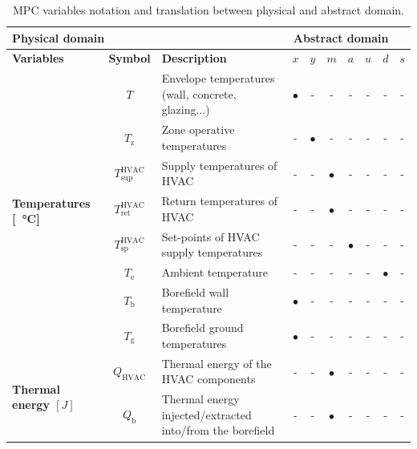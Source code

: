 \documentclass[10pt]{article}
\begin{document}
\begin{table}[ht]
	{\color{blue} 
	\centering
	\caption{MPC variables notation and translation between physical and abstract domain.}
	\label{tab:mpc_form:translation}
	\begin{adjustwidth}{-1cm}{}
	\begin{tabular}{l|c|l|ccccccc}
		\toprule
        \multicolumn{3}{l}{\textbf{Physical domain}} &  \multicolumn{6}{r}{\textbf{Abstract domain}} \\
		\toprule
		\textbf{Variables} & \textbf{Symbol} & \textbf{Description} & \textbf{$x$} & \textbf{$y$} & \textbf{$m$} & \textbf{$a$} & \textbf{$u$} & \textbf{$d$}   & \textbf{$s$} \\ 
		\midrule
		\multirow{8}{*}{\textbf{Temperatures [\SI{}{\celsius}]}} & $T$ & Envelope temperatures (wall, concrete, glazing...) & $\bullet$ & -  & - & - & -& -& -\\ 
		& $T_{\text{z}}$ & Zone operative temperatures  & - & $\bullet$ & -  & - & -& -& -\\
		& $T_{\text{sup}}^{\text{HVAC}}$ & Supply temperatures  of  HVAC  &  - & - & $\bullet$ & -  & -& -& -\\
		& $T_{\text{ret}}^{\text{HVAC}}$ & Return temperatures  of  HVAC  &  - & - & $\bullet$ & - & -& -& - \\
		& $T^{\text{HVAC}}_{\text{sp}}$ & Set-points of HVAC supply temperatures    &  - & - & - & $\bullet$ & - & -& -\\
		& $T_\text{e}$ & Ambient temperature &  - & -& -& - & - & $\bullet$ & -\\
		& $T_\text{b}$ & Borefield wall temperature & $\bullet$ & - & - & -  & - & - & - \\
			& $T_\text{g}$ & Borefield  ground temperatures & $\bullet$ & - & - & -  & - & - & -\\
		\midrule
		\multirow{3}{*}{\textbf{Thermal energy $[J]$}} 
		& $Q_{\text{HVAC}}$ & Thermal energy of the HVAC components  & - & -&  $\bullet$ & - & - &- & - \\
		& $Q_{\text{b}}$ & \makecell[l]{Thermal energy injected/extracted \\ into/from the borefield} & - & - & $\bullet$ & - & - & - & -  \\

\end{tabular}
\end{adjustwidth}}
\end{table}
\end{document}
